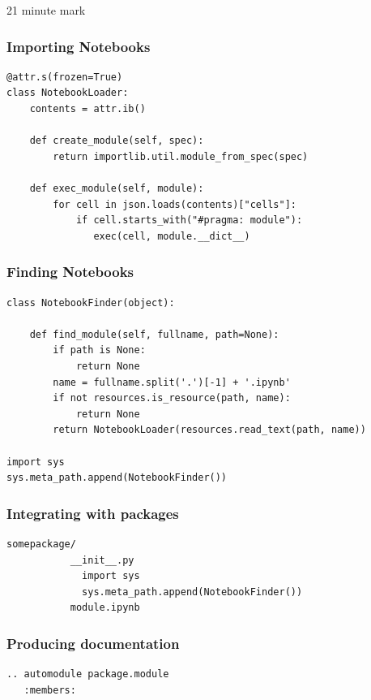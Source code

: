 21 minute mark

\begin{frame}[fragile]
\frametitle{Importing Notebooks}

\begin{lstlisting}
@attr.s(frozen=True)
class NotebookLoader:
    contents = attr.ib()

    def create_module(self, spec):
        return importlib.util.module_from_spec(spec)

    def exec_module(self, module):
        for cell in json.loads(contents)["cells"]:
            if cell.starts_with("#pragma: module"):
               exec(cell, module.__dict__)
\end{lstlisting}

\end{frame}

\begin{frame}[fragile]
\frametitle{Finding Notebooks}

\begin{lstlisting}
class NotebookFinder(object):
 
    def find_module(self, fullname, path=None):
        if path is None:
            return None
        name = fullname.split('.')[-1] + '.ipynb'
        if not resources.is_resource(path, name):
            return None
        return NotebookLoader(resources.read_text(path, name))

import sys
sys.meta_path.append(NotebookFinder())
\end{lstlisting}

\end{frame}

\begin{frame}[fragile]
\frametitle{Integrating with packages}

\begin{lstlisting}
somepackage/
           __init__.py
             import sys
             sys.meta_path.append(NotebookFinder())
           module.ipynb
\end{lstlisting}

\end{frame}


\begin{frame}[fragile]
\frametitle{Producing documentation}

\begin{lstlisting}
.. automodule package.module
   :members:
\end{lstlisting}

\end{frame}

